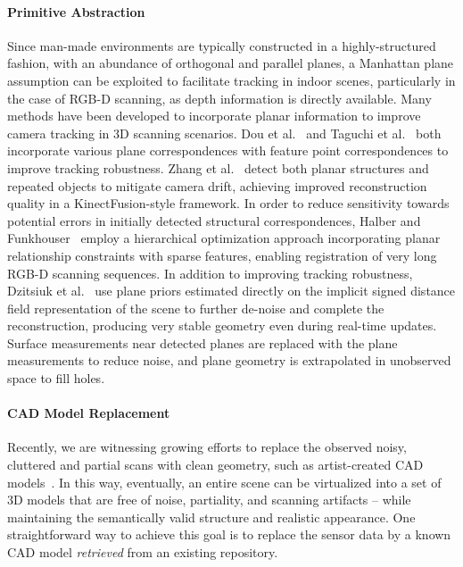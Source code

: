 \paragraph*{Primitive Abstraction} Since man-made environments are typically constructed in a highly-structured fashion, with an abundance of orthogonal and parallel planes, a Manhattan plane assumption can be exploited to facilitate tracking in indoor scenes, particularly in the case of RGB-D scanning, as depth information is directly available.
Many methods have been developed to incorporate planar information to improve camera tracking in 3D scanning scenarios.
Dou et al.~\cite{dou2012exploring} and Taguchi et al.~\cite{taguchi2013point} both incorporate various plane correspondences with feature point correspondences to improve tracking robustness.
Zhang et al.~\cite{zhang2015online} detect both planar structures and repeated objects to mitigate camera drift, achieving improved reconstruction quality in a KinectFusion-style framework.
In order to reduce sensitivity towards potential errors in initially detected structural correspondences, Halber and Funkhouser~\cite{halber2016fine} employ a hierarchical optimization approach incorporating planar relationship constraints with sparse features, enabling registration of very long RGB-D scanning sequences.
In addition to improving tracking robustness, Dzitsiuk et al.~\cite{dzitsiuk2016noising} use plane priors estimated directly on the implicit signed distance field representation of the scene to further de-noise and complete the reconstruction, producing very stable geometry even during real-time updates.
Surface measurements near detected planes are replaced with the plane measurements to reduce noise, and plane geometry is extrapolated in unobserved space to fill holes.

\paragraph*{CAD Model Replacement} Recently, we are witnessing growing efforts to replace the observed noisy, cluttered and partial scans with clean geometry, such as artist-created CAD models~\cite{Li:2015,Avetisyan:2019,Avetisyan:2019:Scan2CAD,Dahnert:2019}. In this way, eventually, an entire scene can be virtualized into a set of 3D models that are free of noise, partiality, and scanning artifacts -- while maintaining the semantically valid structure and realistic appearance. One straightforward way to achieve this goal is to replace the sensor data by a known CAD model \textit{retrieved} from an existing repository.

